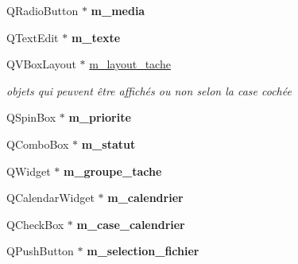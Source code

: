 \begin{DoxyCompactItemize}
\mbox{\label{classfenetre__creation__note_a449c08c43d3f8d9dccd0a258dbdbace6}} 
Q\+Radio\+Button $\ast$ {\bfseries m\+\_\+media}
\item 
\mbox{\label{classfenetre__creation__note_afe742ff20d76a743d300176db81a7b87}} 
Q\+Text\+Edit $\ast$ {\bfseries m\+\_\+texte}
\item 
\mbox{\label{classfenetre__creation__note_a41705de2fed7f8225f33425e711f75df}} 
Q\+V\+Box\+Layout $\ast$ \hyperlink{classfenetre__creation__note_a41705de2fed7f8225f33425e711f75df}{m\+\_\+layout\+\_\+tache}
\begin{DoxyCompactList}\small\item\em objets qui peuvent être affichés ou non selon la case cochée \end{DoxyCompactList}\item 
\mbox{\label{classfenetre__creation__note_ab227c8738d7abaec4971cbfe0906917b}} 
Q\+Spin\+Box $\ast$ {\bfseries m\+\_\+priorite}
\item 
\mbox{\label{classfenetre__creation__note_ad436063e4e77a955700f732e431f49f4}} 
Q\+Combo\+Box $\ast$ {\bfseries m\+\_\+statut}
\item 
\mbox{\label{classfenetre__creation__note_a7f9359a4db77422373b0a5183d73a7f2}} 
Q\+Widget $\ast$ {\bfseries m\+\_\+groupe\+\_\+tache}
\item 
\mbox{\label{classfenetre__creation__note_abd8375b439581464e835375fa74102c1}} 
Q\+Calendar\+Widget $\ast$ {\bfseries m\+\_\+calendrier}
\item 
\mbox{\label{classfenetre__creation__note_ae16a2ce7470e64202a984632d60f233f}} 
Q\+Check\+Box $\ast$ {\bfseries m\+\_\+case\+\_\+calendrier}
\item 
\mbox{\label{classfenetre__creation__note_acf39fbd867215b30c6f8ae32e2eb4339}} 
Q\+Push\+Button $\ast$ {\bfseries m\+\_\+selection\+\_\+fichier}
\item 

\end{DoxyCompactItemize}
